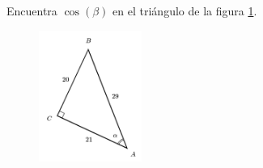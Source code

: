 \question[15] Encuentra $\cos(\beta)$ en el triángulo de la figura \ref{fig:functrig05}.
\begin{figure}[H]
    \begin{center}
        \includegraphics[width=0.3\textwidth]{../images/functrig05.png}
    \end{center}
    \caption{}
    \label{fig:functrig05}
\end{figure}
